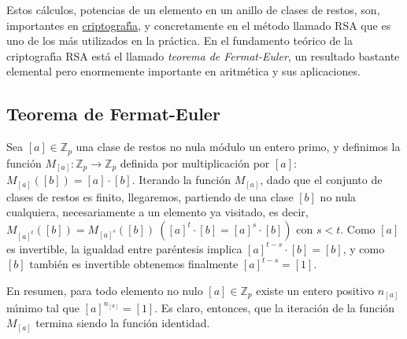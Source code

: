 Estos c\'alculos, potencias de un elemento en un anillo de clases de restos,
son, importantes en \hyperref[rsa]{criptograf\'{\i}a}, y concretamente
en el m\'etodo llamado RSA que es uno de los m\'as utilizados en la pr\'actica.
En el fundamento teórico de la criptograf\'{\i}a RSA est\'a el llamado
{\itshape teorema de Fermat-Euler}, un resultado bastante elemental pero
enormemente importante en aritm\'etica y sus aplicaciones.

\subsection{Teorema de Fermat-Euler}\label{peq}

Sea $[a]\in \mathbb{Z}_p$ una clase de restos no nula m\'odulo un entero primo,
y definimos la funci\'on $M_{[a]}:\mathbb{Z}_p\to \mathbb{Z}_p$ definida por
multiplicaci\'on por $[a]$: $M_{[a]}([b])=[a]\cdot[b]$. Iterando la funci\'on
$M_{[a]}$, dado que el conjunto de
clases de restos es finito, llegaremos, partiendo de una clase $[b]$ no nula 
cualquiera, necesariamente a un elemento ya visitado, es decir,
$M_{[a]^t}([b])=M_{[a]^s}([b])\  ([a]^t\cdot [b]=[a]^s\cdot [b])$ con $s<t$.
Como $[a]$ es invertible, la igualdad entre par\'entesis implica $[a]^{t-s}\cdot
[b]=[b]$, y como $[b]$ tambi\'en es invertible obtenemos finalmente
$[a]^{t-s}=[1].$

En resumen, para todo elemento no nulo $[a]\in \mathbb{Z}_p$ existe un entero
positivo $n_{[a]}$ m\'{\i}nimo tal que $[a]^{n_{[a]}}=[1].$ Es claro, entonces, 
que la iteraci\'on de la funci\'on $M_{[a]}$ termina siendo la funci\'on
identidad.

